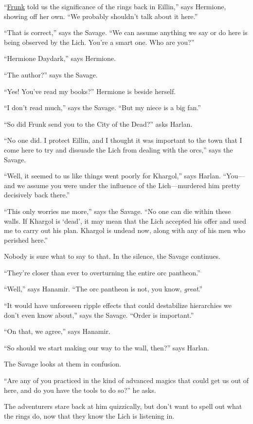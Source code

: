 \documentclass[smalldemyvopaper,11pt,twoside,onecolumn,openright,extrafontsizes]{memoir}
\begin{document}
``\href{/characters/frunk/}{Frunk} told us the significance of the rings
back in Eillin,'' says Hermione, showing off her own. ``We probably
shouldn't talk about it here.''

``That is correct,'' says the Savage. ``We can assume anything we say or
do here is being observed by the Lich. You're a smart one. Who are
you?''

``Hermione Daydark,'' says Hermione.

``The author?'' says the Savage.

``Yes! You've read my books?'' Hermione is beside herself.

``I don't read much,'' says the Savage. ``But my niece is a big fan.''

``So did Frunk send you to the City of the Dead?'' asks Harlan.

``No one did. I protect Eillin, and I thought it was important to the
town that I come here to try and dissuade the Lich from dealing with the
orcs,'' says the Savage.

``Well, it seemed to us like things went poorly for Khargol,'' says
Harlan. ``You---and we assume you were under the influence of the
Lich---murdered him pretty decisively back there.''

``This only worries me more,'' says the Savage. ``No one can die within
these walls. If Khargol is `dead', it may mean that the Lich accepted
his offer and used me to carry out his plan. Khargol is undead now,
along with any of his men who perished here.''

Nobody is sure what to say to that. In the silence, the Savage
continues.

``They're closer than ever to overturning the entire orc pantheon.''

``Well,'' says Hanamir. ``The orc pantheon is not, you know,
\emph{great}.''

``It would have unforeseen ripple effects that could destabilize
hierarchies we don't even know about,'' says the Savage. ``Order is
important.''

``On that, we agree,'' says Hanamir.

``So should we start making our way to the wall, then?'' says Harlan.

The Savage looks at them in confusion.

``Are any of you practiced in the kind of advanced magics that could get
us out of here, and do you have the tools to do so?'' he asks.

The adventurers stare back at him quizzically, but don't want to spell
out what the rings do, now that they know the Lich is listening in.
\end{document}
